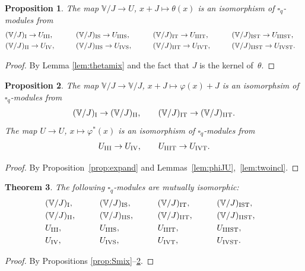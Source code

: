 \documentclass[pdftex]{sigma}
\numberwithin{equation}{section}
\newtheorem{Theorem}{Theorem}[section]
\newtheorem{Proposition}[Theorem]{Proposition}
 { \theoremstyle{definition}
\newtheorem{Definition}[Theorem]{Definition}
\newtheorem{Example}[Theorem]{Example}
\newtheorem{Note}[Theorem]{Note}
}
\begin{document}
\begin{Proposition}\label{prop:thetamix}The map $\mathbb V/J\to U$, $x+J\mapsto \theta(x)$ is an isomorphism of $\square_q$-modules from
\begin{alignat*}{5}
&(\mathbb V/J)_{\rm I} \rightarrow U_{\rm III}, \qquad &&
(\mathbb V/J)_{\rm IS} \rightarrow U_{\rm IIIS}, \qquad &&
(\mathbb V/J)_{\rm IT} \rightarrow U_{\rm IIIT}, \qquad &&
(\mathbb V/J)_{\rm IST} \rightarrow U_{\rm IIIST},&\\
&(\mathbb V/J)_{\rm II} \rightarrow U_{\rm IV}, \qquad &&
(\mathbb V/J)_{\rm IIS} \rightarrow U_{\rm IVS}, \qquad &&
(\mathbb V/J)_{\rm IIT} \rightarrow U_{\rm IVT}, \qquad &&
(\mathbb V/J)_{\rm IIST} \rightarrow U_{\rm IVST}.&
\end{alignat*}
\end{Proposition}
\begin{proof}By Lemma \ref{lem:thetamix} and the fact that $J$ is the kernel of~$\theta$.
\end{proof}

\begin{Proposition}\label{prop:varphimix}The map $\mathbb V/J\to \mathbb V/J$, $x+J\mapsto \varphi(x)+J$ is an isomorphsim of $\square_q$-modules from
\begin{gather*}
 (\mathbb V/J)_{\rm I} \rightarrow (\mathbb V/J)_{\rm II}, \qquad (\mathbb V/J)_{\rm IT} \rightarrow (\mathbb V/J)_{\rm IIT}.
\end{gather*}
The map $U\to U$, $x\mapsto \varphi^*(x)$
is an isomorphism of $\square_q$-modules from
\begin{gather*}
 U_{\rm III} \rightarrow U_{\rm IV}, \qquad U_{\rm IIIT} \rightarrow U_{\rm IVT}.
\end{gather*}
\end{Proposition}
\begin{proof} By Proposition~\ref{prop:expand} and Lemmas~\ref{lem:phiJU},~\ref{lem:twoincl}.
\end{proof}

\begin{Theorem}\label{thm:alliso}The following $\square_q$-modules are mutually isomorphic:
\begin{alignat*}{5}
& (\mathbb V/J)_{\rm I}, \qquad&&
(\mathbb V/J)_{\rm IS}, \qquad&&
(\mathbb V/J)_{\rm IT}, \qquad&&
(\mathbb V/J)_{\rm IST},&\\
& (\mathbb V/J)_{\rm II}, \qquad&&
(\mathbb V/J)_{\rm IIS}, \qquad&&
(\mathbb V/J)_{\rm IIT}, \qquad&&
(\mathbb V/J)_{\rm IIST},&\\
&U_{\rm III}, \qquad &&
U_{\rm IIIS}, \qquad &&
U_{\rm IIIT}, \qquad &&
U_{\rm IIIST},&\\
&U_{\rm IV}, \qquad &&
U_{\rm IVS}, \qquad&&
U_{\rm IVT}, \qquad &&
U_{\rm IVST}.&
\end{alignat*}
\end{Theorem}
\begin{proof} By Propositions \ref{prop:Smix}--\ref{prop:varphimix}.
\end{proof}
\end{document}
